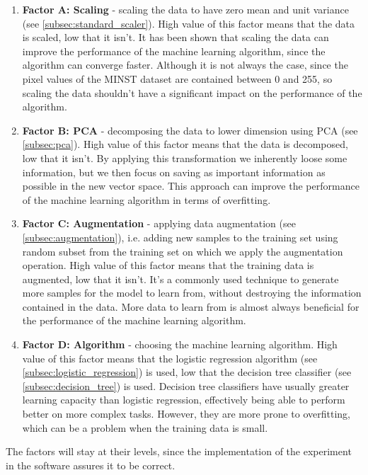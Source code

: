 \documentclass{article}
\begin{document}
\begin{enumerate}
    \item \textbf{Factor A: Scaling} - scaling the data to have zero mean and unit variance (see \ref{subsec:standard_scaler}). High value of this factor means that the data is scaled, low that it isn't. It has been shown that scaling the data can improve the performance of the machine learning algorithm, since the algorithm can converge faster. Although it is not always the case, since the pixel values of the MINST dataset are contained between 0 and 255, so scaling the data shouldn't have a significant impact on the performance of the algorithm.
    \item \textbf{Factor B: PCA} - decomposing the data to lower dimension using PCA (see \ref{subsec:pca}). High value of this factor means that the data is decomposed, low that it isn't. By applying this transformation we inherently loose some information, but we then focus on saving as important information as possible in the new vector space. This approach can improve the performance of the machine learning algorithm in terms of overfitting.
    \item \textbf{Factor C: Augmentation} - applying data augmentation (see \ref{subsec:augmentation}), i.e. adding new samples to the training set using random subset from the training set on which we apply the augmentation operation. High value of this factor means that the training data is augmented, low that it isn't. It's a commonly used technique to generate more samples for the model to learn from, without destroying the information contained in the data. More data to learn from is almost always beneficial for the performance of the machine learning algorithm.
    \item \textbf{Factor D: Algorithm} - choosing the machine learning algorithm. High value of this factor means that the logistic regression algorithm (see \ref{subsec:logistic_regression}) is used, low that the decision tree classifier (see \ref{subsec:decision_tree}) is used. Decision tree classifiers have usually greater learning capacity than logistic regression, effectively being able to perform better on more complex tasks. However, they are more prone to overfitting, which can be a problem when the training data is small.
\end{enumerate}

The factors will stay at their levels, since the implementation of the experiment in the software assures it to be correct.
\end{document}
